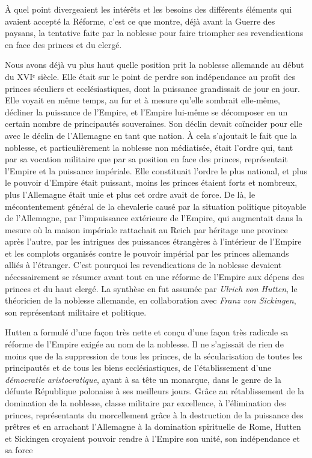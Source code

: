 \documentclass[french,twoside]{book} %
\begin{document}
À quel point divergeaient les intérêts et les besoins des différents éléments qui avaient accepté la Réforme, c’est ce que montre, déjà avant la Guerre des paysans, la tentative faite par la noblesse pour faire triompher ses revendications en face des princes et du clergé.\par
Nous avons déjà vu plus haut quelle position prit la noblesse allemande au début du XVIᵉ siècle. Elle était sur le point de perdre son indépendance au profit des princes séculiers et ecclésiastiques, dont la puissance grandissait de jour en jour. Elle voyait en même temps, au fur et à mesure qu’elle sombrait elle-même, décliner la puissance de l’Empire, et l’Empire lui-même se décomposer en un certain nombre de principautés souveraines. Son déclin devait coïncider pour elle avec le déclin de l’Allemagne en tant que nation. À cela s’ajoutait le fait que la noblesse, et particulièrement la noblesse non médiatisée, était l’ordre qui, tant par sa vocation militaire que par sa position en face des princes, représentait l’Empire et la puissance impériale. Elle constituait l’ordre le plus national, et plus le pouvoir d’Empire était puissant, moins les princes étaient forts et nombreux, plus l’Allemagne était unie et plus cet ordre avait de force. De là, le mécontentement général de la chevalerie causé par la situation politique pitoyable de l’Allemagne, par l’impuissance extérieure de l’Empire, qui augmentait dans la mesure où la maison impériale rattachait au Reich par héritage une province après l’autre, par les intrigues des puissances étrangères à l’intérieur de l’Empire et les complots organisés contre le pouvoir impérial par les princes allemands alliés à l’étranger. C’est pourquoi les revendications de la noblesse devaient nécessairement se résumer avant tout en une réforme de l’Empire aux dépens des princes et du haut clergé. La synthèse en fut assumée par \emph{Ulrich von Hutten}, le théoricien de la noblesse allemande, en collaboration avec \emph{Franz von Sickingen}, son représentant militaire et politique.\par
Hutten a formulé d’une façon très nette et conçu d’une façon très radicale sa réforme de l’Empire exigée au nom de la noblesse. Il ne s’agissait de rien de moins que de la suppression de tous les princes, de la sécularisation de toutes les principautés et de tous les biens ecclésiastiques, de l’établissement d’une \emph{démocratie aristocratique}, ayant à sa tête un monarque, dans le genre de la défunte République polonaise à ses meilleurs jours. Grâce au rétablissement de la domination de la noblesse, classe militaire par excellence, à l’élimination des princes, représentants du morcellement grâce à la destruction de la puissance des prêtres et en arrachant l’Allemagne à la domination spirituelle de Rome, Hutten et Sickingen croyaient pouvoir rendre à l’Empire son unité, son indépendance et sa force\par
\end{document}
